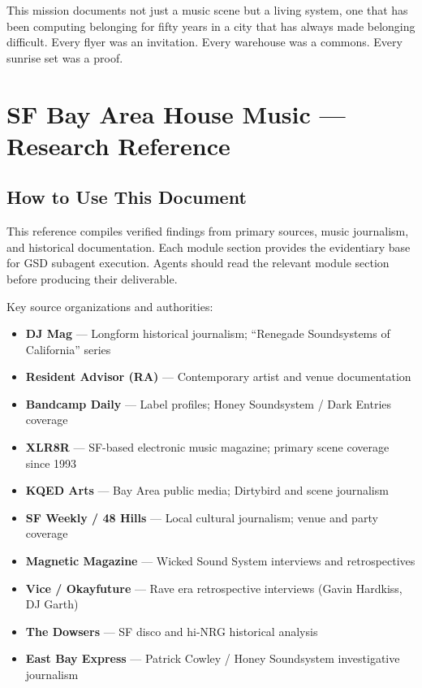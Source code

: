 \documentclass[11pt,letterpaper]{article}
\newcommand{\stageheader}[2]{%
  \noindent\colorbox{#2}{\makebox[\textwidth][l]{%
    \textcolor{white}{\bfseries\sffamily\hspace{6pt}#1\hspace{6pt}}}}%
  \vspace{0.5em}\par%
}
\begin{document}
This mission documents not just a music scene but a living system, one that has been computing belonging for fifty years in a city that has always made belonging difficult. Every flyer was an invitation. Every warehouse was a commons. Every sunrise set was a proof.

\newpage

\stageheader{STAGE 2 --- RESEARCH REFERENCE}{secondary}

\section{SF Bay Area House Music --- Research Reference}

\subsection{How to Use This Document}

This reference compiles verified findings from primary sources, music journalism, and historical documentation. Each module section provides the evidentiary base for GSD subagent execution. Agents should read the relevant module section before producing their deliverable.

Key source organizations and authorities:
\begin{itemize}[leftmargin=1.5em]
  \item \textbf{DJ Mag} --- Longform historical journalism; ``Renegade Soundsystems of California'' series
  \item \textbf{Resident Advisor (RA)} --- Contemporary artist and venue documentation
  \item \textbf{Bandcamp Daily} --- Label profiles; Honey Soundsystem / Dark Entries coverage
  \item \textbf{XLR8R} --- SF-based electronic music magazine; primary scene coverage since 1993
  \item \textbf{KQED Arts} --- Bay Area public media; Dirtybird and scene journalism
  \item \textbf{SF Weekly / 48 Hills} --- Local cultural journalism; venue and party coverage
  \item \textbf{Magnetic Magazine} --- Wicked Sound System interviews and retrospectives
  \item \textbf{Vice / Okayfuture} --- Rave era retrospective interviews (Gavin Hardkiss, DJ Garth)
  \item \textbf{The Dowsers} --- SF disco and hi-NRG historical analysis
  \item \textbf{East Bay Express} --- Patrick Cowley / Honey Soundsystem investigative journalism
\end{itemize}
\end{document}
